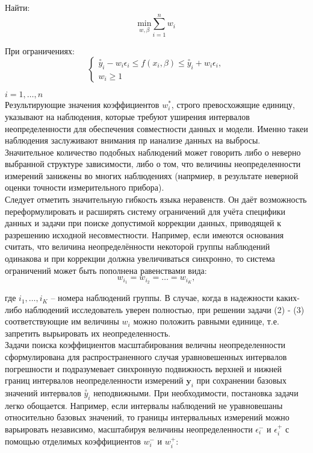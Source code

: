 Найти: \\
\begin{equation}
	\underset {w, \beta}{\text{min}} \sum\limits_{i=1}^{n} w_i
\end{equation}

При ограничениях: \\

\begin{equation}
	\begin{cases}
		\stackrel{\circ}{y}_i - w_i \epsilon_i \leq f(x_i,\beta) \leq \stackrel{\circ}{y}_i + w_i \epsilon_i, \\
		w_i \geq 1 
	\end{cases}
\end{equation}

$i = 1, \ldots, n$ \\

Результирующие значения коэффициентов $w_{i}^{*}$, строго превосхожящие единицу, указывают на наблюдения, которые требуют уширения интервалов неопределенности для обеспечения совместности данных и модели. Именно такеи наблюдения заслуживают внимания пр ианализе данных на выбросы. Значительное количество подобных наблюдений может говорить либо о неверно выбранной структуре зависимости, либо о том, что величины неопределенности измерений занижены во многих наблюдениях (напрмиер, в результате неверной оценки точности измерительного прибора). \\
Следует отметить значительную гибкость языка неравенств. Он даёт возможность переформулировать и расширять систему ограничений для учёта специфики данных и задачи при поиске допустимой коррекции данных, приводящей к разрешению исходной несовместности. Например, если имеются основания считать, что величина неопределённости некоторой группы наблюдений одинакова и при коррекции должна увеличиваться синхронно, то система ограничений может быть пополнена равенствами вида: \\

\begin{equation*}
	w_{i_1} = w_{i_{2}} = \ldots = w_{i_K}, 
\end{equation*}

где $i_1, \ldots, i_K$ -- номера наблюдений группы. В случае, когда в надежности каких-либо наблюдений исследователь уверен полностью, при решении задачи (2) - (3) соответствующие им величины $w_i$ можно положить равными единице, т.е. запретить вырьировать их неопределенность. \\
Задачи поиска коэффициентов масштабирования величны неопределенности сформулирована для распространенного случая уравновешенных интервалов погрешности и подразумевает синхронную подвижность верхней и нижней границ интервалов неопределенности измерений $\bm{y}_i$ при сохранении базовых значений интервалов $\stackrel{\circ}{y}_i$ неподвижными. При необходимости, постановка задачи легко обощается. Например, если интервалы наблюдений не уравновешаны относительно базовых значений, то границы интервальных измерений можно варьировать независимо, масштабируя величины неопределенности $\epsilon_i^{-}$ и $\epsilon_{i}^{+}$ с помощью отделимых коэффициентов $w_i^{-}$ и $w_{i}^{+}$: \\

